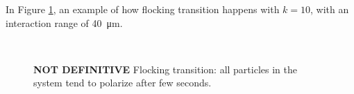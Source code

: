 \documentclass[../../master_thesis_np.tex]{subfiles}
\begin{document}
		In Figure \ref{fig:flock40}, an example of how flocking transition happens with $k = 10$, with an interaction range of \SI{40}{\micro\meter}.
		\begin{figure}[htp]
			\centering
			\\
			
			\caption{\textbf{NOT DEFINITIVE} Flocking transition: all particles in the system tend to polarize after few seconds. }
			\label{fig:flock40}
		\end{figure}
			
\end{document}
